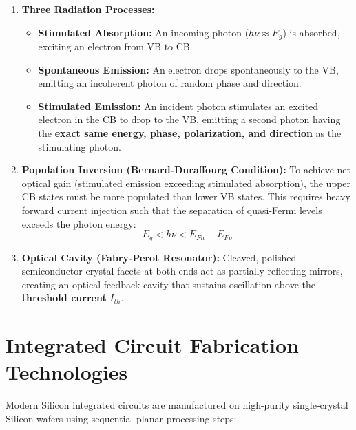 \documentclass[12pt,a4paper]{article}
\begin{document}
\begin{enumerate}[label=\arabic*., leftmargin=*]
  \item \textbf{Three Radiation Processes:}
    \begin{itemize}
      \item \textbf{Stimulated Absorption:} An incoming photon ($h\nu \approx E_g$) is absorbed, exciting an electron from VB to CB.
      \item \textbf{Spontaneous Emission:} An electron drops spontaneously to the VB, emitting an incoherent photon of random phase and direction.
      \item \textbf{Stimulated Emission:} An incident photon stimulates an excited electron in the CB to drop to the VB, emitting a second photon having the \textbf{exact same energy, phase, polarization, and direction} as the stimulating photon.
    \end{itemize}

  \item \textbf{Population Inversion (Bernard-Duraffourg Condition):}
  To achieve net optical gain (stimulated emission exceeding stimulated absorption), the upper CB states must be more populated than lower VB states. This requires heavy forward current injection such that the separation of quasi-Fermi levels exceeds the photon energy:
  \begin{equation}
    E_g < h\nu < E_{Fn} - E_{Fp}
  \end{equation}

  \item \textbf{Optical Cavity (Fabry-Perot Resonator):}
  Cleaved, polished semiconductor crystal facets at both ends act as partially reflecting mirrors, creating an optical feedback cavity that sustains oscillation above the \textbf{threshold current} $I_{th}$.
\end{enumerate}

\section{Integrated Circuit Fabrication Technologies}

Modern Silicon integrated circuits are manufactured on high-purity single-crystal Silicon wafers using sequential planar processing steps:
\end{document}

